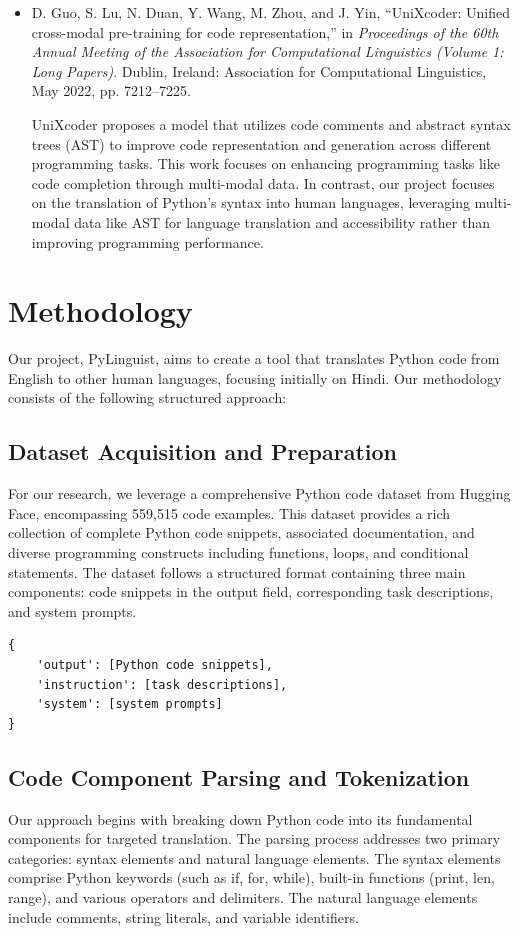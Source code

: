 \documentclass[9pt]{article}
\begin{document}
\begin{itemize}
        \item D. Guo, S. Lu, N. Duan, Y. Wang, M. Zhou, and J. Yin, “UniXcoder: Unified cross-modal pre-training for code representation,” in \textit{Proceedings of the 60th Annual Meeting of the Association for Computational Linguistics (Volume 1: Long Papers)}. Dublin, Ireland: Association for Computational Linguistics, May 2022, pp. 7212–7225.
        
        UniXcoder proposes a model that utilizes code comments and abstract syntax trees (AST) to improve code representation and generation across different programming tasks. This work focuses on enhancing programming tasks like code completion through multi-modal data. In contrast, our project focuses on the translation of Python's syntax into human languages, leveraging multi-modal data like AST for language translation and accessibility rather than improving programming performance.
    \end{itemize}

\section{Methodology}

Our project, PyLinguist, aims to create a tool that translates Python code from English to other human languages, focusing initially on Hindi. Our methodology consists of the following structured approach:
\subsection{Dataset Acquisition and Preparation}
For our research, we leverage a comprehensive Python code dataset from Hugging Face, encompassing 559,515 code examples. This dataset provides a rich collection of complete Python code snippets, associated documentation, and diverse programming constructs including functions, loops, and conditional statements. The dataset follows a structured format containing three main components: code snippets in the output field, corresponding task descriptions, and system prompts.

\begin{lstlisting}
{
    'output': [Python code snippets],
    'instruction': [task descriptions],
    'system': [system prompts]
}
\end{lstlisting}

\subsection{Code Component Parsing and Tokenization}
Our approach begins with breaking down Python code into its fundamental components for targeted translation. The parsing process addresses two primary categories: syntax elements and natural language elements. The syntax elements comprise Python keywords (such as if, for, while), built-in functions (print, len, range), and various operators and delimiters. The natural language elements include comments, string literals, and variable identifiers.
\end{document}
